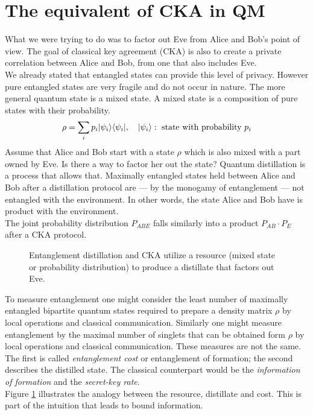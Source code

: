 	
    
\section{The equivalent of CKA in QM}
	What we were trying to do was to factor out Eve from Alice and Bob's point of view.
	The goal of classical key agreement (CKA) is also to create a private correlation between Alice and Bob, from one that also includes Eve.\\
	We already stated that entangled states can provide this level of privacy.
	However pure entangled states are very fragile and do not occur in nature.
	The more general quantum state is a mixed state.
	A mixed state is a composition of pure states with their probability.
	\begin{equation}
		\rho = \sum_i p_i |\psi_i \rangle\langle \psi_i| ,\quad |\psi_i \rangle: \text{ state with probability } p_i
	\end{equation}
	Assume that Alice and Bob start with a state $\rho$ which is also mixed with a part owned by Eve. 
	Is there a way to factor her out the state?
	Quantum distillation is a process that allows that. 
	Maximally entangled states held between Alice and Bob after a distillation protocol are --- by the monogamy of entanglement --- not entangled with the environment. 
	In other words, the state Alice and Bob have is product with the environment.\\
	The joint probability distribution $P_{ABE}$ falls similarly into a product $P_{AB}\cdot P_E$ after a CKA protocol.\\
    
    \begin{figure}[h]
    	\centering
    	
    	\caption{Entanglement distillation and CKA utilize a resource (mixed state or probability distribution) to produce a distillate that factors out Eve.}
    	\label{Fig:intuition}
    \end{figure}
    
    To measure entanglement one might consider the least number of maximally entangled bipartite quantum states required to prepare a density matrix $\rho$ by local operations and classical communication. 
    Similarly one might measure entanglement by the maximal number of singlets that can be obtained form $\rho$ by local operations and classical communication. 
    These measures are not the same. 
    The first is called \emph{entanglement cost} or entanglement of formation; the second describes the distilled state. 
    The classical counterpart would be the \emph{information of formation} and the \emph{secret-key rate}.\\
    Figure \ref{Fig:intuition} illustrates the analogy between the resource, distillate and cost.
    This is part of the intuition that leads to bound information.
    
    